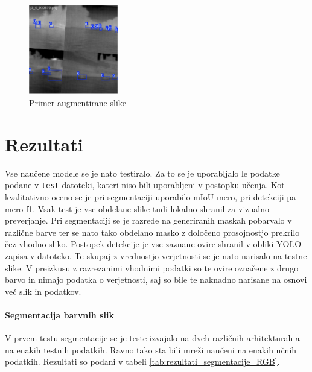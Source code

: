 \documentclass[10pt,twocolumn,letterpaper]{article}
\begin{document}
\begin{figure}[h!]
    \centering %
    \includegraphics[width=0.35\textwidth]{Slike/augmented_image.PNG} %
    \caption{Primer augmentirane slike} %
    \label{fig:augmented_image} %
\end{figure}

\section{Rezultati}
Vse naučene modele se je nato testiralo. Za to se je uporabljalo le podatke podane v \texttt{test} datoteki, kateri niso bili uporabljeni v postopku učenja. Kot kvalitativno oceno se je pri segmentaciji uporabilo mIoU mero, pri detekciji pa mero f1. Vsak test je vse obdelane slike tudi lokalno shranil za vizualno preverjanje. Pri segmentaciji se je razrede na generiranih maskah pobarvalo v različne barve ter se nato tako obdelano masko z določeno prosojnostjo prekrilo čez vhodno sliko. Postopek detekcije je vse zaznane ovire shranil v obliki YOLO zapisa v datoteko. Te skupaj z vrednostjo verjetnosti se je nato narisalo na testne slike. V preizkusu z razrezanimi vhodnimi podatki so te ovire označene z drugo barvo in nimajo podatka o verjetnosti, saj so bile te naknadno narisane na osnovi več slik in podatkov.

\paragraph{Segmentacija barvnih slik\newline}
V prvem testu segmentacije se je teste izvajalo na dveh različnih arhitekturah a na enakih testnih podatkih. Ravno tako sta bili mreži naučeni na enakih učnih podatkih. Rezultati so podani v tabeli \ref{tab:rezultati_segmentacije_RGB}.
\end{document}
